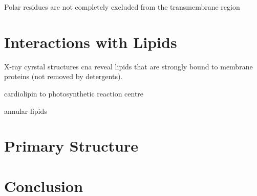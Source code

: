 \documentclass[
]{article}
\begin{document}
Polar residues are not completely excluded from the transmembrane region

\hypertarget{interactions-with-lipids}{%
\section{Interactions with Lipids}\label{interactions-with-lipids}}

X-ray cyrstal structures cna reveal lipids that are strongly bound to membrane proteins (not removed by detergents).

cardiolipin to photosynthetic reaction centre

annular lipids

\hypertarget{primary-structure-1}{%
\section{Primary Structure}\label{primary-structure-1}}

\hypertarget{conclusion}{%
\section{Conclusion}\label{conclusion}}
\end{document}
